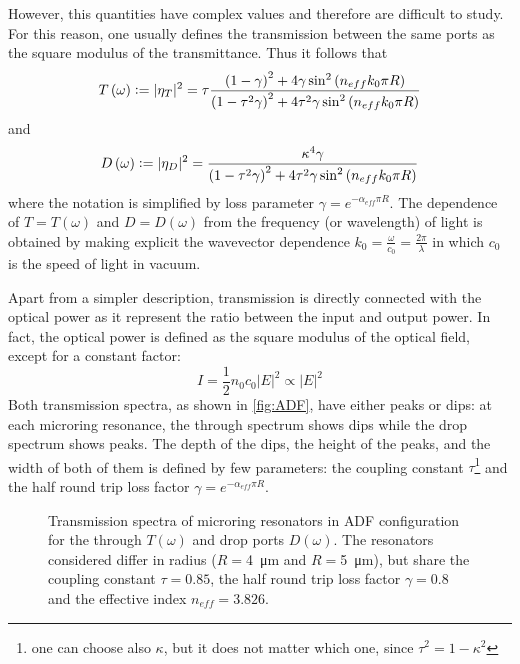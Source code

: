 However, this quantities have complex values and therefore are difficult to study.
For this reason, one usually defines the transmission between the same ports as the square modulus of the transmittance.
Thus it follows that
\begin{equation}
T \left( \omega \right) \vcentcolon= |\eta_T|^2 = \tau 
\dfrac	{ \left( 1- 				\gamma \right)^2 + 4 				\gamma \sin^2 \left( n_{eff} k_0 \pi R \right) }
			{ \left( 1-\tau^2	\gamma \right)^2 + 4 \tau^2	\gamma \sin^2 \left( n_{eff} k_0 \pi R \right) }
\end{equation}
and
\begin{equation}
D \left( \omega \right) \vcentcolon= |\eta_D|^2 =
\dfrac	{ \kappa^4 \gamma}
			{ \left( 1-\tau^2	\gamma \right)^2 + 4 \tau^2	\gamma \sin^2 \left( n_{eff} k_0 \pi R \right) }
\end{equation}
where the notation is simplified by loss parameter $\gamma = e^{-\alpha_{eff}\pi R}$.
The dependence of $T=T(\omega)$ and $D=D(\omega)$ from the frequency (or wavelength) of light is obtained by making explicit the wavevector dependence $k_0=\frac{\omega}{c_0}=\frac{2\pi}{\lambda}$ in which $c_0$ is the speed of light in vacuum.

Apart from a simpler description, transmission is directly connected with the optical power as it represent the ratio between the input and output power.
In fact, the optical power is defined as the square modulus of the optical field, except for a constant factor:
$$ I = \frac{1}{2}n_0c_0|E|^2 \propto |E|^2$$
Both transmission spectra, as shown in \autoref{fig:ADF}, have either peaks or dips: at each microring resonance, the through spectrum shows dips while the drop spectrum shows peaks.
The depth of the dips, the height of the peaks, and the width of both of them is defined by few parameters: the coupling constant $\tau$\footnote{one can choose also $\kappa$, but it does not matter which one, since $\tau^2 = 1-\kappa^2$} and the half round trip loss factor $\gamma = e^{-\alpha_{eff}\pi R}$.

\begin{figure}[htbp]
	\centering
	
	\caption{
		Transmission spectra of microring resonators in \ac{ADF} configuration for the through $T(\omega)$ and drop ports $D(\omega)$.
		The resonators considered differ in radius ($R=$\SI{4}{\um} and $R=$\SI{5}{\um}), but share the coupling constant $\tau=0.85$, the half round trip loss factor $\gamma=0.8$ and the effective index $n_{eff}=3.826$.
	}
	\label{fig:ADF}
\end{figure}

